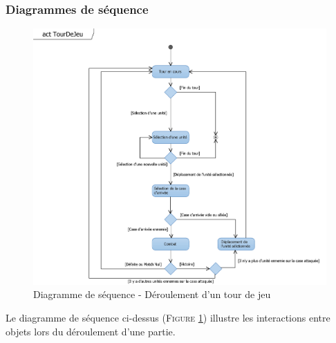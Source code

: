 \documentclass[a4paper,11pt]{article}
\begin{document}
		\subsubsection{Diagrammes de séquence}
			\begin{figure}[ht!]
				\includegraphics{actTourDeJeu.png}
				\caption{Diagramme de séquence - Déroulement d'un tour de jeu}
				\label{fig:seqtour}
				\end{figure}
			\vspace*{1cm}
			Le diagramme de séquence ci-dessus (\textsc{Figure \ref{fig:seqtour}}) illustre les interactions entre objets lors du déroulement d'une partie.
			\newpage
\end{document}
